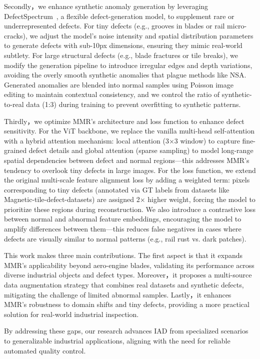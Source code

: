 Secondly，we enhance synthetic anomaly generation by leveraging DefectSpectrum~\cite{DefectSpectrum}, a flexible defect-generation model, to supplement rare or underrepresented defects. 
For tiny defects (e.g., grooves in blades or rail micro-cracks), we adjust the model’s noise intensity and spatial distribution parameters to generate defects with sub-10px dimensions, 
ensuring they mimic real-world subtlety. For large structural defects (e.g., blade fractures or tile breaks), we modify the generation pipeline to introduce irregular edges and depth variations, avoiding the overly smooth synthetic anomalies that plague methods like NSA. 
Generated anomalies are blended into normal samples using Poisson image editing to maintain contextual consistency, and we control the ratio of synthetic-to-real data (1:3) during training to prevent overfitting to synthetic patterns.

Thirdly，we optimize MMR’s architecture and loss function to enhance defect sensitivity. 
For the ViT backbone, we replace the vanilla multi-head self-attention with a hybrid attention mechanism: local attention (3×3 window) to capture fine-grained defect details and global attention (sparse sampling) to model long-range spatial dependencies between defect and normal regions—this addresses MMR’s tendency to overlook tiny defects in large images. For the loss function, we extend the original multi-scale feature alignment loss by adding a weighted term: pixels corresponding to tiny defects (annotated via GT labels from datasets like Magnetic-tile-defect-datasets) are assigned 2× higher weight, forcing the model to prioritize these regions during reconstruction. We also introduce a contrastive loss between normal and abnormal feature embeddings, encouraging the model to amplify differences between them—this reduces false negatives in cases where defects are visually similar to normal patterns (e.g., rail rust vs. dark patches).

This work makes three main contributions. The first aspect is that it expands MMR’s applicability beyond aero-engine blades, validating its performance across diverse industrial objects and defect types. Moreover，it proposes a multi-source data augmentation strategy that combines real datasets and synthetic defects, mitigating the challenge of limited abnormal samples. Lastly，it enhances MMR’s robustness to domain shifts and tiny defects, providing a more practical solution for real-world industrial inspection.

By addressing these gaps, our research advances IAD from specialized scenarios to generalizable industrial applications, aligning with the need for reliable automated quality control.
